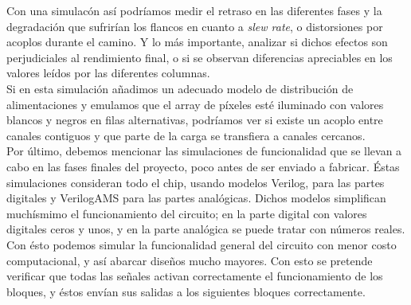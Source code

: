 Con una simulacón así podríamos medir el retraso en las diferentes fases y la
degradación que sufrirían los flancos en cuanto a \textit{slew rate}, o distorsiones
por acoplos durante el camino. Y lo más importante, analizar si dichos efectos
son perjudiciales al rendimiento final, o si se observan diferencias apreciables
en los valores leídos por las diferentes columnas.\\

Si en esta simulación añadimos un adecuado modelo de distribución de alimentaciones
y emulamos que el array de píxeles esté iluminado con valores blancos y negros en
filas alternativas, podríamos ver si existe un acoplo entre canales contiguos y
que parte de la carga se transfiera a canales cercanos.\\

Por último, debemos mencionar las simulaciones de funcionalidad que se llevan
a cabo en las fases finales del proyecto, poco antes de ser enviado a fabricar.
Éstas simulaciones consideran todo el chip, usando modelos Verilog, para las partes
digitales y VerilogAMS para las partes analógicas. Dichos modelos simplifican
muchísmimo el funcionamiento del circuito; en la parte digital con valores
digitales ceros y unos, y en la parte analógica se puede tratar con números reales.
Con ésto podemos simular la funcionalidad general del circuito con menor costo
computacional, y así abarcar diseños mucho mayores. Con esto se pretende verificar
que todas las señales activan correctamente el funcionamiento de los bloques, y éstos
envían sus salidas a los siguientes bloques correctamente.\\
